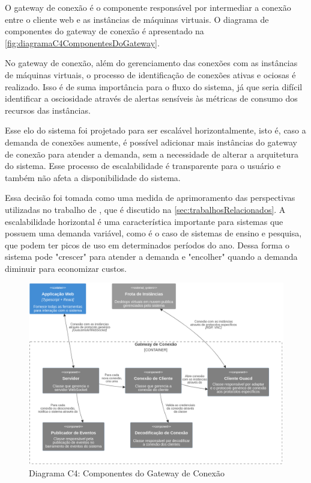 O gateway de conexão é o componente responsável por intermediar a conexão entre o cliente web e as instâncias de máquinas virtuais. O diagrama de componentes do gateway de conexão é apresentado na \autoref{fig:diagramaC4ComponentesDoGateway}.

No gateway de conexão, além do gerenciamento das conexões com as instâncias de máquinas virtuais, o processo de identificação de conexões ativas e ociosas é realizado. Isso é de suma importância para o fluxo do sistema, já que seria difícil identificar a osciosidade através de alertas sensíveis às métricas de consumo dos recursos das instâncias.

Esse elo do sistema foi projetado para ser escalável horizontalmente, isto é, caso a demanda de conexões aumente, é possível adicionar mais instâncias do gateway de conexão para atender a demanda, sem a necessidade de alterar a arquitetura do sistema. Esse processo de escalabilidade é transparente para o usuário e também não afeta a disponibilidade do sistema.

Essa decisão foi tomada como uma medida de aprimoramento das perspectivas utilizadas no trabalho de \citet{edufirestick}, que é discutido na \autoref{sec:trabalhosRelacionados}. A escalabilidade horizontal é uma característica importante para sistemas que possuem uma demanda variável, como é o caso de sistemas de ensino e pesquisa, que podem ter picos de uso em determinados períodos do ano. Dessa forma o sistema pode "crescer" para atender a demanda e "encolher" quando a demanda diminuir para economizar custos.

\begin{figure}[H]
\caption{Diagrama C4: Componentes do Gateway de Conexão}
\label{fig:diagramaC4ComponentesDoGateway}
\includegraphics[width=\textwidth]{capitulos/2-metodologia/files/c4-component-connection-gateway.png}
\end{figure}


